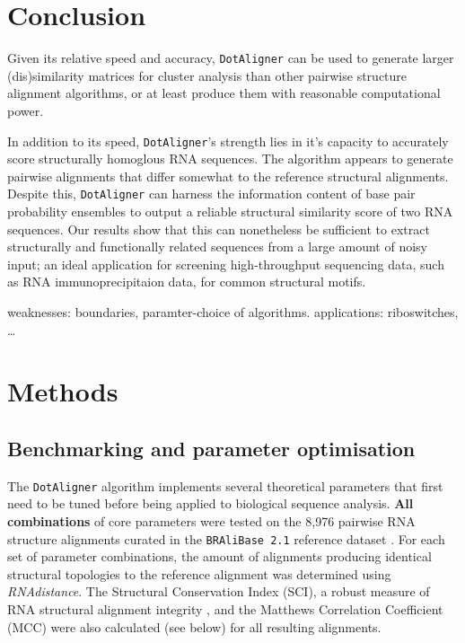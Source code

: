 \documentclass{bmcart}
\newcommand\dotaligner{\texttt{DotAligner}}
\newcommand\bralibase{\texttt{BRAliBase 2.1}}
\begin{document}
\section*{Conclusion}
Given its relative speed and accuracy, \dotaligner{} can be used to generate larger 
(dis)similarity matrices for cluster analysis than other pairwise structure 
alignment algorithms, or at least produce them with reasonable computational 
power.  

In addition to its speed, \dotaligner{}'s strength lies in it's capacity to accurately
score structurally homoglous RNA sequences. The algorithm appears to 
generate pairwise alignments that differ somewhat to the reference 
structural alignments. Despite this, \dotaligner{} can harness the information
content of base pair probability ensembles to output a reliable 
structural similarity score of two RNA sequences. Our results show that this
can nonetheless be sufficient to extract structurally and functionally related
sequences from a large amount of noisy input; an ideal application 
for screening high-throughput sequencing data, such as RNA 
immunoprecipitaion data, for common structural motifs. 

{\color{red} weaknesses: boundaries, paramter-choice of algorithms. applications: riboswitches, \ldots}


\section*{Methods}
\subsection*{Benchmarking and parameter optimisation}
The \dotaligner{} algorithm implements several theoretical parameters that first need to 
be tuned before being applied to biological sequence analysis.\textbf{ All combinations} of 
core parameters were tested on the 8,976 pairwise RNA structure alignments curated in the 
\bralibase{} reference dataset \cite{wilm2006enhanced}. For each set of parameter combinations, 
the amount of alignments producing identical structural topologies to the reference alignment
was determined using \textit{RNAdistance}. The Structural Conservation Index (SCI), a robust 
measure of RNA structural alignment integrity \cite{gruber2008strategies}, and the Matthews Correlation Coefficient (MCC) were also calculated (see below) for all resulting alignments. 
\end{document}
